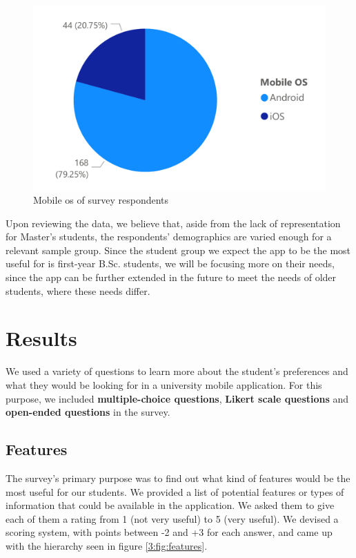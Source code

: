 \begin{figure}[ht]
    \centering
         \includegraphics[height=0.2\textheight]{figures/charts/survey/os.pdf}
    \caption{Mobile \acrshort{os} of survey respondents}
    \label{3:fig:os}
\end{figure}

Upon reviewing the data, we believe that, aside from the lack of representation for Master's students, the respondents' demographics are varied enough for a relevant sample group. Since the student group we expect the app to be the most useful for is first-year B.Sc. students, we will be focusing more on their needs, since the app can be further extended in the future to meet the needs of older students, where these needs differ.

\section{Results} \label{3:results}

We used a variety of questions to learn more about the student's preferences and what they would be looking for in a university mobile application. For this purpose, we included \textbf{multiple-choice questions}, \textbf{Likert scale questions} and \textbf{open-ended questions} in the survey.

\subsection{Features} \label{3:features}

The survey's primary purpose was to find out what kind of features would be the most useful for our students. We provided a list of potential features or types of information that could be available in the application. We asked them to give each of them a rating from 1 (not very useful) to 5 (very useful). We devised a scoring system, with points between -2 and +3 for each answer, and came up with the hierarchy seen in figure \ref{3:fig:features}.

